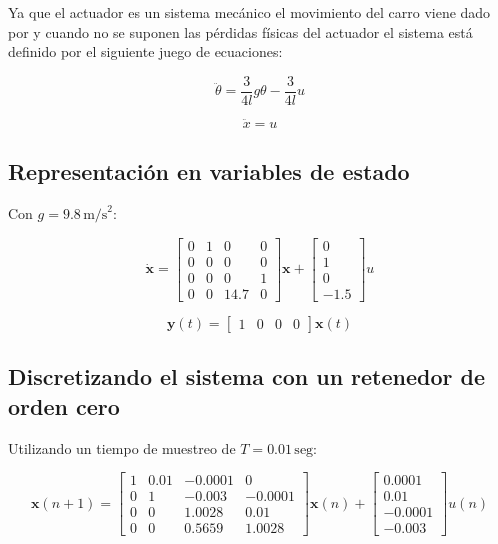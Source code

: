 Ya que el actuador es un sistema mecánico el movimiento del carro viene dado por y cuando no se suponen las pérdidas físicas del actuador el sistema está definido por el siguiente juego de ecuaciones:

\[
\ddot{\theta} = \frac{3}{4l}g\theta - \frac{3}{4l}u
\]

\[
\ddot{x} = u
\]

\subsection{Representación en variables de estado}

Con $g = 9.8 \, \text{m/s}^2$:

\[
\dot{\mathbf{x}} = \begin{bmatrix} 0 & 1 & 0 & 0 \\ 0 & 0 & 0 & 0 \\ 0 & 0 & 0 & 1 \\ 0 & 0 & 14.7 & 0 \end{bmatrix} \mathbf{x} + \begin{bmatrix} 0 \\ 1 \\ 0 \\ -1.5 \end{bmatrix} u
\]

\[
\mathbf{y}(t) = \begin{bmatrix} 1 & 0 & 0 & 0 \end{bmatrix} \mathbf{x}(t)
\]

\subsection{Discretizando el sistema con un retenedor de orden cero}

Utilizando un tiempo de muestreo de $T = 0.01 \, \text{seg}$:

\[
\mathbf{x}(n+1) = \begin{bmatrix} 1 & 0.01 & -0.0001 & 0 \\ 0 & 1 & -0.003 & -0.0001 \\ 0 & 0 & 1.0028 & 0.01 \\ 0 & 0 & 0.5659 & 1.0028 \end{bmatrix} \mathbf{x}(n) + \begin{bmatrix} 0.0001 \\ 0.01 \\ -0.0001 \\ -0.003 \end{bmatrix} u(n)
\]

